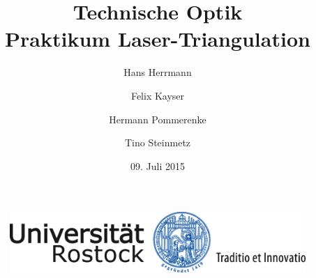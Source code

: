 \documentclass[11pt,fleqn]{article}
\title{Technische Optik \\ Praktikum Laser-Triangulation}
\date{09. Juli 2015}
\author{Hans Herrmann \and Felix Kayser \and Hermann Pommerenke \and Tino Steinmetz}
\begin{document}
	\begin{figure}[t]
	    \centering
	    \includegraphics[width=115mm]{img/UNI-Logo_Siegel_4c_115mm_07.png}
	\end{figure}

	\maketitle
	
	\thispagestyle{empty}

	\newpage
	\pagestyle{headings}
	\tableofcontents
	
	\everymath{\displaystyle} %
	
	\newpage

	
	
	\clearpage
	
	
	\clearpage
	
	
	\clearpage
	\printbibliography
\end{document}
